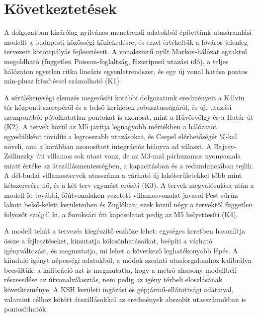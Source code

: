 \documentclass[12pt,a4paper]{article}
\theoremstyle{definition}
\theoremstyle{remark}
\begin{document}
\section{Következtetések}
\label{sec:kovetkeztetes}

A dolgozatban kizárólag nyilvános menetrendi adatokból építettünk
utasáramlási modellt a budapesti közösségi közlekedésre, és ezzel értékeltük a
főváros jelenleg tervezett kötöttpályás fejlesztéseit. A vonalszintű nyílt
Markov-hálózat egzaktul megoldható (független Poisson-foglaltság,
fázistípusú utazási idő), a teljes hálózaton egyetlen ritka lineáris
egyenletrendszer, és egy új vonal hatása pontos min-plusz frissítéssel
számolható (K1).

A sérülékenységi elemzés megerősíti korábbi dolgozatunk eredményeit a Kálvin
tér központi szerepéről és a belső kerületek robusztusságáról, és új,
utazási szempontból pótolhatatlan pontokat is azonosít, mint a Hűvösvölgy és a
Határ út (K2). A tervek közül az M5 javítja legnagyobb mértékben a hálózatot,
egyedüliként rövidíti a legrosszabb utazásokat, és Csepel elérhetőségét
\PLMFDXXI\%-kal növeli, ami a korábban azonosított integrációs hiányra ad
választ. A Bajcsy-Zsilinszky úti villamos sok utast vonz, de az M3-mal
párhuzamos nyomvonala miatt értéke az átszállásmentességben, a kapacitásban
és a redundanciában rejlik. A dél-budai villamostervek utasszáma a várható új
lakóterületekkel több mint kétszeresére nő, és a két terv egymást erősíti
(K3). A tervek megvalósulása után a modell öt további, főútvonalakon
vezetett villamosvonalat javasol Pest sűrűn lakott belső-keleti
kerületeiben és Zuglóban; ezek közül négy a tervektől független folyosót
szolgál ki, a Soroksári úti kapcsolatot pedig az M5 helyettesíti (K4).

A modell tehát a tervezés kiegészítő eszköze lehet: egységes keretben
hasonlítja össze a fejlesztéseket, kimutatja kölcsönhatásaikat, beépíti a
várható igényváltozást, és megmutatja, mi lehet a következő leghatékonyabb
lépés. A kiinduló igényt népességi adatokból, a módok szerinti utasforgalomhoz
kalibrálva becsültük; a kalibráció azt is megmutatta, hogy a metró alacsony
modellbeli részesedése az útvonalválasztás, nem pedig az igény térbeli
eloszlásának következménye. A KSH kerületi ingázási és gépjármű-ellátottsági
adataival, valamint célhoz kötött átszállásokkal az eredmények abszolút
utasszámokban is pontosíthatók.
\end{document}

